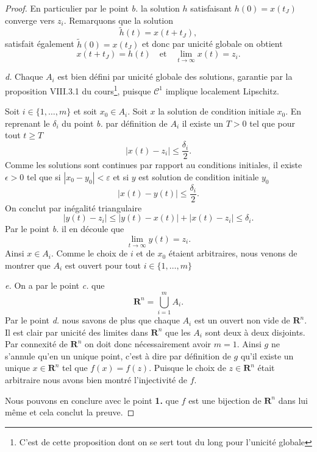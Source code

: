 \documentclass[12pt]{article}
\newcommand{\R}{\mathbf{R}}
\begin{document}
\begin{proof}
En particulier par le point \textit{b.} la solution $h$ satisfaisant  $h(0) = x(t_{J})$ converge vers $z_{i}$. Remarquons que la solution \[
        \tilde{h}(t) = x(t + t_{J})
,\] satisfait également $\tilde{h}(0) = x(t_{J})$ et donc par unicité globale on obtient \[
x(t + t_{J}) = h(t) \quad \text{et} \quad \lim_{t\to \infty}x(t) = z_{i}
.\]  

\medskip

\textit{d.} Chaque $A_{i}$ est bien défini par unicité globale des solutions, garantie par la proposition VIII.3.1 du cours\footnote{C'est de cette proposition dont on se sert tout du long pour l'unicité globale}, puisque $\mathcal{C}^{1}$ implique localement Lipschitz.

Soit $i \in \{1, \ldots, m\}$ et soit $x_0 \in A_{i}$. Soit $x$ la solution de condition initiale  $x_0$. En reprenant le $\delta_{i}$ du point \textit{b.} par définition de $A_{i}$ il existe un $T > 0$ tel que pour tout $t \ge T$ \[
        |x(t) - z_{i}| \le \frac{\delta_{i}}{2}
.\] Comme les solutions sont continues par rapport au conditions initiales, il existe $\epsilon > 0$ tel que si $|x_0 - y_0| < \varepsilon$ et si $y$ est solution de condition initiale $y_0$ \[
|x(t) - y(t)| \le \frac{\delta_{i}}{2} 
.\]  
On conclut par inégalité triangulaire \[
        |y(t) - z_{i}| \le |y(t) - x(t)| + |x(t) - z_{i}| \le \delta_{i}
.\]
Par le point \textit{b.} il en découle que \[
        \lim_{t\to \infty}y(t) = z_{i}
.\] Ainsi $x \in A_{i}$. Comme le choix de $i$ et de $x_0$ étaient arbitraires, nous venons de montrer que $A_{i}$ est ouvert pour tout $i \in \{1, \ldots, m\}$ 

\medskip

\textit{e.} On a par le point \textit{c.} que \[
\R^{n} = \bigcup_{i=1}^{m}A_{i}
.\] Par le point \textit{d.} nous savons de plus que chaque $A_{i}$ est un ouvert non vide de $\R^{n}$. Il est clair par unicité des limites dans $\R^{n}$ que les $A_{i}$ sont deux à deux disjoints. Par connexité de $\R^{n}$ on doit donc nécessairement avoir $m = 1$. Ainsi $g$ ne s'annule qu'en un unique point, c'est à dire par définition de $g$ qu'il existe un unique $x \in \R^{n}$ tel que $f(x) = f(z)$. Puisque le choix de $z \in \R^{n}$ était arbitraire nous avons bien montré l'injectivité de $f$.

Nous pouvons en conclure avec le point \textbf{1.} que $f$ est une bijection de $\R^{n}$ dans lui même et cela conclut la preuve.
\end{proof}

\bigskip
\end{document}
